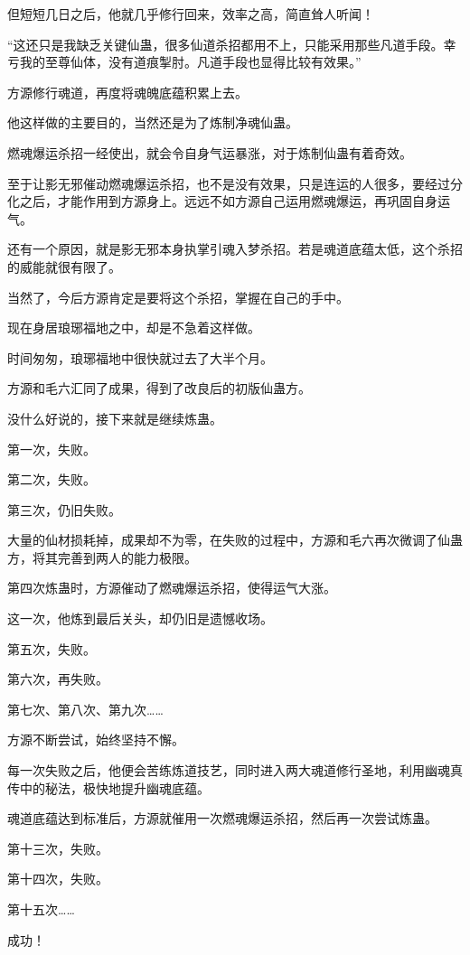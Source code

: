 \begin{this_body}
但短短几日之后，他就几乎修行回来，效率之高，简直耸人听闻！

“这还只是我缺乏关键仙蛊，很多仙道杀招都用不上，只能采用那些凡道手段。幸亏我的至尊仙体，没有道痕掣肘。凡道手段也显得比较有效果。”

方源修行魂道，再度将魂魄底蕴积累上去。

他这样做的主要目的，当然还是为了炼制净魂仙蛊。

燃魂爆运杀招一经使出，就会令自身气运暴涨，对于炼制仙蛊有着奇效。

至于让影无邪催动燃魂爆运杀招，也不是没有效果，只是连运的人很多，要经过分化之后，才能作用到方源身上。远远不如方源自己运用燃魂爆运，再巩固自身运气。

还有一个原因，就是影无邪本身执掌引魂入梦杀招。若是魂道底蕴太低，这个杀招的威能就很有限了。

当然了，今后方源肯定是要将这个杀招，掌握在自己的手中。

现在身居琅琊福地之中，却是不急着这样做。

时间匆匆，琅琊福地中很快就过去了大半个月。

方源和毛六汇同了成果，得到了改良后的初版仙蛊方。

没什么好说的，接下来就是继续炼蛊。

第一次，失败。

第二次，失败。

第三次，仍旧失败。

大量的仙材损耗掉，成果却不为零，在失败的过程中，方源和毛六再次微调了仙蛊方，将其完善到两人的能力极限。

第四次炼蛊时，方源催动了燃魂爆运杀招，使得运气大涨。

这一次，他炼到最后关头，却仍旧是遗憾收场。

第五次，失败。

第六次，再失败。

第七次、第八次、第九次……

方源不断尝试，始终坚持不懈。

每一次失败之后，他便会苦练炼道技艺，同时进入两大魂道修行圣地，利用幽魂真传中的秘法，极快地提升幽魂底蕴。

魂道底蕴达到标准后，方源就催用一次燃魂爆运杀招，然后再一次尝试炼蛊。

第十三次，失败。

第十四次，失败。

第十五次……

成功！


\end{this_body}
